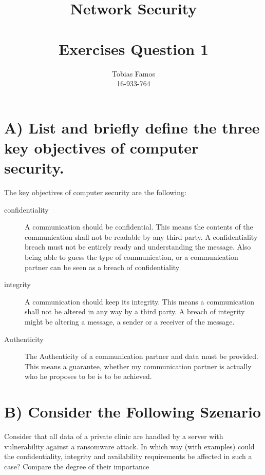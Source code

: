 \documentclass[11pt,a4paper]{article}
\title{Network Security \\ ~\\ \Large{Exercises Question 1}}
\author{Tobias Famos\\ 16-933-764}
\begin{document}
    \maketitle
    \section*{A) List and briefly define the three key objectives of computer security.}
    The key objectives of computer security are the following:
    \begin{description}
        \item [confidentiality] A communication should be confidential.
        This means the contents of the communication shall not be readable by any third party.
        A confidentiality breach must not be entirely ready and understanding the message.
        Also being able to guess the type of communication, or a communication partner can be seen as a breach of confidentiality
        \item[integrity] A communication should keep its integrity.
        This means a communication shall not be altered in any way by a third party.
        A breach of integrity might be altering a message, a sender or a receiver of the message.
        \item[Authenticity] The Authenticity of a communication partner and data must be provided.
        This means a guarantee, whether my communication partner is actually who he proposes to be is to be achieved.
    \end{description}

    \section*{B)  Consider the Following Szenario}
    Consider that all data of a private clinic are handled by a server with vulnerability against a ransomware attack.
    In which way (with examples) could the confidentiality, integrity and availability requirements be affected in such a case?
    Compare the degree of their importance
\end{document}

